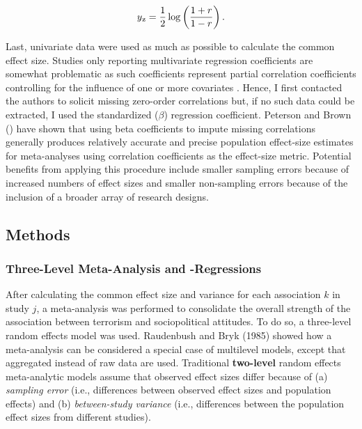 \begin{equation}
y\textsubscript{z} = \frac{1}{2} \log\left(\frac{1 + r}{1 - r}\right).
\end{equation}


Last, univariate data were used as much as possible to calculate the common effect size. Studies only reporting multivariate regression coefficients are somewhat problematic as such coefficients represent partial correlation coefficients controlling for the influence of one or more covariates \citep{Peterson2005}. Hence, I first contacted the authors to solicit missing zero-order correlations but, if no such data could be extracted, I used the standardized ($\beta$) regression coefficient. Peterson and Brown (\citeyear{Peterson2005}) have shown that using beta coefficients to impute missing correlations generally produces relatively accurate and precise population effect-size estimates for meta-analyses using correlation coefficients as the effect-size metric. Potential benefits from applying this procedure include smaller sampling errors because of increased numbers of effect sizes and smaller non-sampling errors because of the inclusion of a broader array of research designs. 

\subsection{Methods}
\subsubsection{Three-Level Meta-Analysis and -Regressions}
\vspace{-2mm}
After calculating the common effect size and variance for each association $k$ in study $j$, a meta-analysis was performed to consolidate the overall strength of the association between terrorism and sociopolitical attitudes. To do so, a three-level random effects model was used. Raudenbush and Bryk (1985) showed how a meta-analysis can be considered a special case of multilevel models, except that aggregated instead of raw data are used. Traditional \textbf{two-level} random effects meta-analytic models assume that observed effect sizes differ because of (a) \textit{sampling error} (i.e., differences between observed effect sizes and population effects) and (b) \textit{between-study variance} (i.e., differences between the population effect sizes from different studies). 


